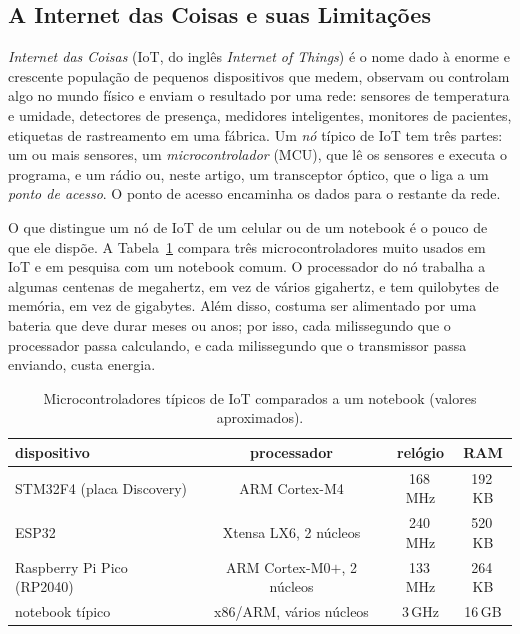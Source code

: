 \subsection{A Internet das Coisas e suas Limitações}\label{sec:fund-iot}
\emph{Internet das Coisas} (IoT, do inglês \emph{Internet of Things}) é o nome
dado à enorme e crescente população de pequenos dispositivos que medem,
observam ou controlam algo no mundo físico e enviam o resultado por uma rede:
sensores de temperatura e umidade, detectores de presença, medidores
inteligentes, monitores de pacientes, etiquetas de rastreamento em uma fábrica.
Um \emph{nó} típico de IoT tem três partes: um ou mais sensores, um
\emph{microcontrolador} (MCU), que lê os sensores e executa o programa, e um
rádio ou, neste artigo, um transceptor óptico, que o liga a um \emph{ponto de
acesso}. O ponto de acesso encaminha os dados para o restante da rede.

O que distingue um nó de IoT de um celular ou de um notebook é o pouco de que
ele dispõe. A Tabela~\ref{tab:mcus} compara três microcontroladores muito
usados em IoT e em pesquisa com um notebook comum. O processador do nó trabalha
a algumas centenas de megahertz, em vez de vários gigahertz, e tem quilobytes
de memória, em vez de gigabytes. Além disso, costuma ser alimentado por uma
bateria que deve durar meses ou anos; por isso, cada milissegundo que o
processador passa calculando, e cada milissegundo que o transmissor passa
enviando, custa energia.

\begin{table}[!htb]
\caption{Microcontroladores típicos de IoT comparados a um notebook (valores
aproximados).}
\label{tab:mcus}
\centering
\small
\begin{tabular}{lccc}
\toprule
dispositivo & processador & relógio & RAM\\
\midrule
STM32F4 (placa Discovery)  & ARM Cortex-M4 & 168\,MHz & 192\,KB\\
ESP32                      & Xtensa LX6, 2 núcleos & 240\,MHz & 520\,KB\\
Raspberry Pi Pico (RP2040) & ARM Cortex-M0$+$, 2 núcleos & 133\,MHz & 264\,KB\\
\midrule
notebook típico            & x86/ARM, vários núcleos & 3\,GHz & 16\,GB\\
\bottomrule
\end{tabular}
\end{table}

